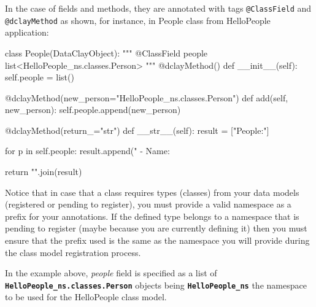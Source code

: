 In the case of fields and methods, they are annotated with tags \texttt{@ClassField} and \texttt{@dclayMethod} as shown, for instance, in People class from HelloPeople application:

\begin{tBox}
 \begin{python}
  class People(DataClayObject):
    """
    @ClassField people list<HelloPeople_ns.classes.Person>
    """
    @dclayMethod()
    def __init__(self):
        self.people = list()

    @dclayMethod(new_person="HelloPeople_ns.classes.Person")
    def add(self, new_person):
        self.people.append(new_person)

    @dclayMethod(return_="str")
    def __str__(self):
        result = ["People:"]

        for p in self.people:
            result.append(" - Name: %

        return "\n".join(result)
 \end{python}
\end{tBox}

Notice that in case that a class requires types (classes) from your data models (registered or pending to register), you must provide a valid namespace as a prefix for your annotations. If the defined type belongs to a namespace that is pending to register (maybe because you are currently defining it) then you must ensure that the prefix used is the same as the namespace you will provide during the class model registration process.

In the example above, \textit{people} field is specified as a list of {\bf \texttt{HelloPeople\_ns.classes.Person}} objects being {\bf \texttt{HelloPeople\_ns}} the namespace to be used for the HelloPeople class model.


